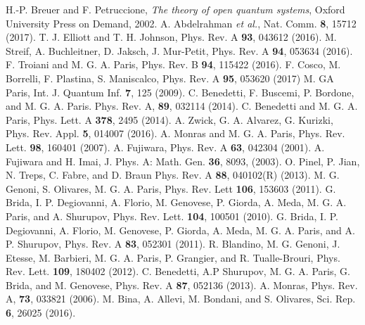 \documentclass[ pra,a4paper,aps,twocolumn,superscriptaddress]{revtex4-1}
\begin{document}
\begin{thebibliography}{99}
H.-P. Breuer and F. Petruccione, {\it The theory
of open quantum systems}, Oxford University Press
on Demand, 2002.
 A. Abdelrahman {\it et al.}, Nat. Comm. {\bf 8}, 15712 (2017).
 T. J. Elliott and T. H. Johnson, Phys. Rev. A {\bf 93}, 043612 (2016).
 M. Streif, A. Buchleitner, D. Jaksch, J. Mur-Petit, Phys. Rev. A {\bf 94}, 053634 (2016).
 F. Troiani and M. G. A. Paris, Phys. Rev. B {\bf 94}, 115422 (2016).
 F. Cosco, M. Borrelli, F. Plastina, S. Maniscalco, Phys. Rev. A {\bf 95}, 053620 (2017)
 M. GA Paris, Int. J. Quantum Inf. {\bf 7}, 125 (2009).
 C. Benedetti, F. Buscemi, P. Bordone, and M. G. A. Paris. Phys. Rev. A, {\bf 89}, 032114 (2014).
 C. Benedetti and M. G. A. Paris, Phys. Lett. A {\bf 378}, 2495 (2014).
 A. Zwick, G. A. Alvarez, G. Kurizki, Phys. Rev.  Appl. {\bf 5}, 014007 (2016).
 A. Monras and M. G. A. Paris, Phys. Rev. Lett. {\bf 98}, 160401 (2007).
 A. Fujiwara, Phys. Rev. A {\bf 63}, 042304 (2001).
 A. Fujiwara and H. Imai, J. Phys. A: Math. Gen. {\bf 36}, 8093, (2003).
O. Pinel, P. Jian, N. Treps, C. Fabre, and D. Braun Phys. Rev. A {\bf 88}, 040102(R) (2013).
 M. G. Genoni, S. Olivares, M. G. A. Paris, 	Phys. Rev. Lett {\bf 106}, 153603 (2011).
 G. Brida, I. P. Degiovanni, A. Florio, M. Genovese, P. Giorda, A. Meda, M. G. A. Paris, and A. Shurupov, Phys. Rev. Lett.
{\bf 104}, 100501 (2010).
 G. Brida, I. P. Degiovanni, A. Florio, M. Genovese, P. Giorda, A. Meda, M. G. A. Paris, and A. P. Shurupov, Phys. Rev. A {\bf 83}, 052301 (2011).
 R. Blandino, M. G. Genoni, J. Etesse, M.
Barbieri, M. G. A. Paris, P. Grangier, and R. Tualle-Brouri, Phys. Rev. Lett. {\bf 109}, 180402 (2012).
 C. Benedetti, A.P Shurupov, M. G. A.
Paris, G. Brida, and M. Genovese, Phys. Rev. A {\bf 87}, 052136 (2013).
 A. Monras, Phys. Rev. A, {\bf 73}, 033821 (2006). 
  M. Bina, A. Allevi, M. Bondani, and S. Olivares, Sci. Rep. {\bf 6}, 26025 (2016). 


\end{thebibliography}
\end{document}
